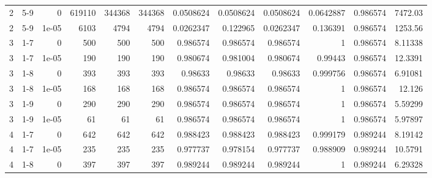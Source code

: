 \begin{tabular}{rlrrrrrrrrrr}
     2 & 5-9    &      0     &      619110 &            344368 &            344368 &     0.0508624   &     0.0508624   &      0.0508624   &        0.0642887 &               0.986574 &         7472.03    \\
     2 & 5-9    &      1e-05 &        6103 &              4794 &              4794 &     0.0262347   &     0.122965    &      0.0262347   &        0.136391  &               0.986574 &         1253.56    \\
     3 & 1-7    &      0     &         500 &               500 &               500 &     0.986574    &     0.986574    &      0.986574    &        1         &               0.986574 &            8.11338 \\
     3 & 1-7    &      1e-05 &         190 &               190 &               190 &     0.980674    &     0.981004    &      0.980674    &        0.99443   &               0.986574 &           12.3391  \\
     3 & 1-8    &      0     &         393 &               393 &               393 &     0.98633     &     0.98633     &      0.98633     &        0.999756  &               0.986574 &            6.91081 \\
     3 & 1-8    &      1e-05 &         168 &               168 &               168 &     0.986574    &     0.986574    &      0.986574    &        1         &               0.986574 &           12.126   \\
     3 & 1-9    &      0     &         290 &               290 &               290 &     0.986574    &     0.986574    &      0.986574    &        1         &               0.986574 &            5.59299 \\
     3 & 1-9    &      1e-05 &          61 &                61 &                61 &     0.986574    &     0.986574    &      0.986574    &        1         &               0.986574 &            5.97897 \\
     4 & 1-7    &      0     &         642 &               642 &               642 &     0.988423    &     0.988423    &      0.988423    &        0.999179  &               0.989244 &            8.19142 \\
     4 & 1-7    &      1e-05 &         235 &               235 &               235 &     0.977737    &     0.978154    &      0.977737    &        0.988909  &               0.989244 &           10.5791  \\
     4 & 1-8    &      0     &         397 &               397 &               397 &     0.989244    &     0.989244    &      0.989244    &        1         &               0.989244 &            6.29328 \\

\end{tabular}
